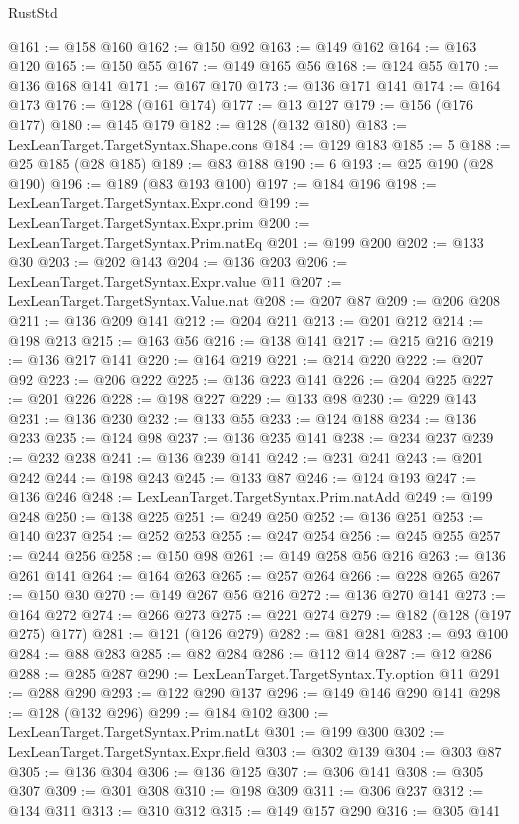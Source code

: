 \begin{lexlean}{RustStd}
\begin{coremodule}
@161 := @158 @160
@162 := @150 @92
@163 := @149 @162
@164 := @163 @120
@165 := @150 @55
@167 := @149 @165 @56
@168 := @124 @55
@170 := @136 @168 @141
@171 := @167 @170
@173 := @136 @171 @141
@174 := @164 @173
@176 := @128 (@161 @174)
@177 := @13 @127
@179 := @156 (@176 @177)
@180 := @145 @179
@182 := @128 (@132 @180)
@183 := LexLeanTarget.TargetSyntax.Shape.cons
@184 := @129 @183
@185 := 5
@188 := @25 @185 (@28 @185)
@189 := @83 @188
@190 := 6
@193 := @25 @190 (@28 @190)
@196 := @189 (@83 @193 @100)
@197 := @184 @196
@198 := LexLeanTarget.TargetSyntax.Expr.cond
@199 := LexLeanTarget.TargetSyntax.Expr.prim
@200 := LexLeanTarget.TargetSyntax.Prim.natEq
@201 := @199 @200
@202 := @133 @30
@203 := @202 @143
@204 := @136 @203
@206 := LexLeanTarget.TargetSyntax.Expr.value @11
@207 := LexLeanTarget.TargetSyntax.Value.nat
@208 := @207 @87
@209 := @206 @208
@211 := @136 @209 @141
@212 := @204 @211
@213 := @201 @212
@214 := @198 @213
@215 := @163 @56
@216 := @138 @141
@217 := @215 @216
@219 := @136 @217 @141
@220 := @164 @219
@221 := @214 @220
@222 := @207 @92
@223 := @206 @222
@225 := @136 @223 @141
@226 := @204 @225
@227 := @201 @226
@228 := @198 @227
@229 := @133 @98
@230 := @229 @143
@231 := @136 @230
@232 := @133 @55
@233 := @124 @188
@234 := @136 @233
@235 := @124 @98
@237 := @136 @235 @141
@238 := @234 @237
@239 := @232 @238
@241 := @136 @239 @141
@242 := @231 @241
@243 := @201 @242
@244 := @198 @243
@245 := @133 @87
@246 := @124 @193
@247 := @136 @246
@248 := LexLeanTarget.TargetSyntax.Prim.natAdd
@249 := @199 @248
@250 := @138 @225
@251 := @249 @250
@252 := @136 @251
@253 := @140 @237
@254 := @252 @253
@255 := @247 @254
@256 := @245 @255
@257 := @244 @256
@258 := @150 @98
@261 := @149 @258 @56 @216
@263 := @136 @261 @141
@264 := @164 @263
@265 := @257 @264
@266 := @228 @265
@267 := @150 @30
@270 := @149 @267 @56 @216
@272 := @136 @270 @141
@273 := @164 @272
@274 := @266 @273
@275 := @221 @274
@279 := @182 (@128 (@197 @275) @177)
@281 := @121 (@126 @279)
@282 := @81 @281
@283 := @93 @100
@284 := @88 @283
@285 := @82 @284
@286 := @112 @14
@287 := @12 @286
@288 := @285 @287
@290 := LexLeanTarget.TargetSyntax.Ty.option @11
@291 := @288 @290
@293 := @122 @290 @137
@296 := @149 @146 @290 @141
@298 := @128 (@132 @296)
@299 := @184 @102
@300 := LexLeanTarget.TargetSyntax.Prim.natLt
@301 := @199 @300
@302 := LexLeanTarget.TargetSyntax.Expr.field
@303 := @302 @139
@304 := @303 @87
@305 := @136 @304
@306 := @136 @125
@307 := @306 @141
@308 := @305 @307
@309 := @301 @308
@310 := @198 @309
@311 := @306 @237
@312 := @134 @311
@313 := @310 @312
@315 := @149 @157 @290
@316 := @305 @141

\end{coremodule}
\end{lexlean}
